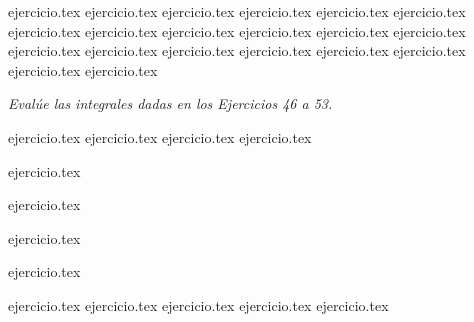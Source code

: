 \begin{enumerate}
    \setcounter{enumi}{25}
    {ejercicio.tex}
{ejercicio.tex}
{ejercicio.tex}
{ejercicio.tex}
{ejercicio.tex}
{ejercicio.tex}
{ejercicio.tex}
{ejercicio.tex}
{ejercicio.tex}
{ejercicio.tex}
{ejercicio.tex}
{ejercicio.tex}
{ejercicio.tex}
{ejercicio.tex}
{ejercicio.tex}
{ejercicio.tex}
{ejercicio.tex}
{ejercicio.tex}
{ejercicio.tex}
{ejercicio.tex}
\end{enumerate}

\vspace{1em}
\noindent \textit{Evalúe las integrales dadas en los Ejercicios 46 a 53.}

\begin{enumerate}
    \setcounter{enumi}{45}
    \begin{minipage}{0.45\textwidth}
    {ejercicio.tex}
{ejercicio.tex}
{ejercicio.tex}
{ejercicio.tex}
\end{minipage}%
    \begin{minipage}{0.45\textwidth}
    \setcounter{enumi}{49}
    {ejercicio.tex}
\addtocounter{enumi}{1}
    {ejercicio.tex}
\addtocounter{enumi}{1}
    {ejercicio.tex}
\addtocounter{enumi}{1}
    {ejercicio.tex}
\end{minipage}
\end{enumerate}

\vspace{1em}
\begin{enumerate}
    \setcounter{enumi}{53}
    {ejercicio.tex}
{ejercicio.tex}
{ejercicio.tex}
{ejercicio.tex}
{ejercicio.tex}
\end{enumerate}